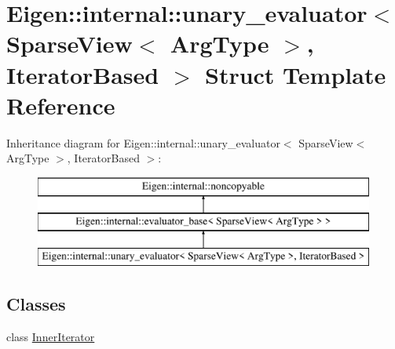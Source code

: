 \hypertarget{struct_eigen_1_1internal_1_1unary__evaluator_3_01_sparse_view_3_01_arg_type_01_4_00_01_iterator_based_01_4}{}\section{Eigen\+::internal\+::unary\+\_\+evaluator$<$ Sparse\+View$<$ Arg\+Type $>$, Iterator\+Based $>$ Struct Template Reference}
\label{struct_eigen_1_1internal_1_1unary__evaluator_3_01_sparse_view_3_01_arg_type_01_4_00_01_iterator_based_01_4}
Inheritance diagram for Eigen\+::internal\+::unary\+\_\+evaluator$<$ Sparse\+View$<$ Arg\+Type $>$, Iterator\+Based $>$\+:\begin{figure}[H]
\begin{center}
\leavevmode
\includegraphics[height=3.000000cm]{struct_eigen_1_1internal_1_1unary__evaluator_3_01_sparse_view_3_01_arg_type_01_4_00_01_iterator_based_01_4}
\end{center}
\end{figure}
\subsection*{Classes}
\begin{DoxyCompactItemize}
\item 
class \mbox{\hyperlink{class_eigen_1_1internal_1_1unary__evaluator_3_01_sparse_view_3_01_arg_type_01_4_00_01_iterator_based_01_4_1_1_inner_iterator}{Inner\+Iterator}}
\end{DoxyCompactItemize}
